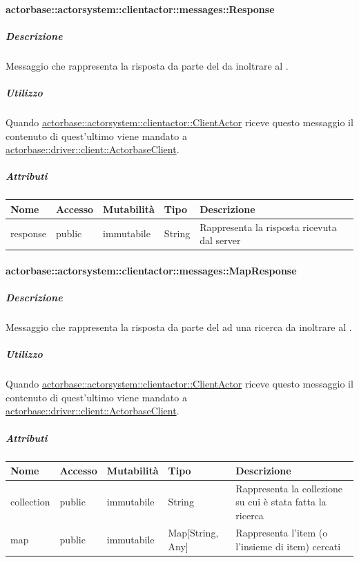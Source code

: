 \documentclass{scalatekids-article}
\begin{document}
\paragraph{actorbase::actorsystem::clientactor::messages::Response}
\label{sec:actorbase::actorsystem::clientactor::messages::Response}

\subparagraph{Descrizione}

Messaggio che rappresenta la risposta da parte del  da inoltrare
al .

\subparagraph{Utilizzo}

Quando \hyperref[sec:actorbase::actorsystem::clientactor::ClientActor]{actorbase::actorsystem::clientactor::ClientActor}
riceve questo messaggio il contenuto di quest'ultimo viene
mandato a \hyperref[sec:actorbase::driver::client::ActorbaseClient]{actorbase::driver::\allowbreak{}client::\allowbreak{}ActorbaseClient}.

\subparagraph{Attributi}
\begin{tabular}{| p{3cm} | p{1.5cm} | p{2cm} | p{2cm} | p{8.5cm} |}
  \hline
  Nome & Accesso & Mutabilità & Tipo & Descrizione\\
  \hline
  response & public & immutabile & String & Rappresenta la risposta ricevuta dal server \\
  \hline
\end{tabular}

\paragraph{actorbase::actorsystem::clientactor::messages::MapResponse}
\label{sec:actorbase::actorsystem::clientactor::messages::MapResponse}

\subparagraph{Descrizione}

Messaggio che rappresenta la risposta da parte del  ad una ricerca da inoltrare
al .

\subparagraph{Utilizzo}

Quando \hyperref[sec:actorbase::actorsystem::clientactor::ClientActor]{actorbase::actorsystem::clientactor::ClientActor}
riceve questo messaggio il contenuto di quest'ultimo viene
mandato a \hyperref[sec:actorbase::driver::client::ActorbaseClient]{actorbase::driver::\allowbreak{}client::\allowbreak{}ActorbaseClient}.

\subparagraph{Attributi}
\begin{tabular}{| p{3cm} | p{1.5cm} | p{2cm} | p{2cm} | p{8.5cm} |}
  \hline
  Nome & Accesso & Mutabilità & Tipo & Descrizione\\
  \hline
  collection & public & immutabile & String & Rappresenta la collezione su cui è stata fatta la ricerca \\
  \hline
  map & public & immutabile & Map[String, Any] & Rappresenta l'item (o l'insieme di item) cercati \\
  \hline
\end{tabular}
\end{document}
